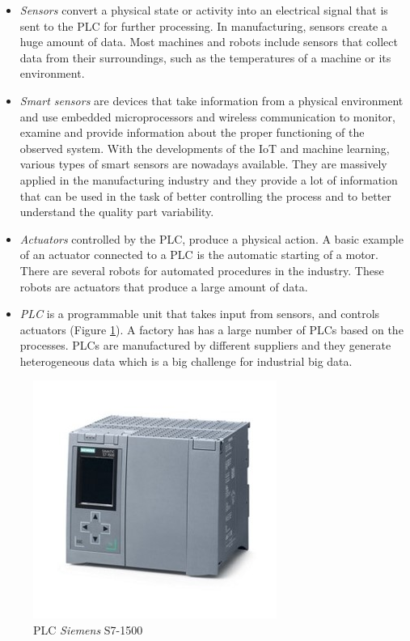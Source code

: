 \begin{itemize}
    \item \textit{Sensors} convert a physical state or activity into an electrical signal that is sent to the PLC for further processing. In manufacturing, sensors create a huge amount of data. Most machines and robots include sensors that collect data from their surroundings, such as the temperatures of a machine or its environment.
    \item \textit{Smart sensors} are devices that take information from a physical environment and use embedded microprocessors and wireless communication to monitor, examine and provide information about the proper functioning of the observed system. With the developments of the IoT and machine learning, various types of smart sensors are nowadays available. They are massively applied in the manufacturing industry and they provide a lot of information that can be used in the task of better controlling the process and to better understand the quality part variability.
    \item \textit{Actuators} controlled by the PLC, produce a physical action. A basic example of an actuator connected to a PLC is the automatic starting of a motor. There are several robots for automated procedures in the industry. These robots are actuators that produce a large amount of data.
    \item \textit{PLC} is a programmable unit that takes input from sensors, and controls actuators (Figure \ref{fig:plc}). A factory has has a large number of PLCs based on the processes. PLCs are manufactured by different suppliers and they generate heterogeneous data which is a big challenge for industrial big data.
\end{itemize}

\begin{figure}
\centerline{\includegraphics[scale=1]{images/chapter_3/PLC.jpg}}
\caption{PLC \textit{Siemens} S7-1500}
\label{fig:plc}
\end{figure}


